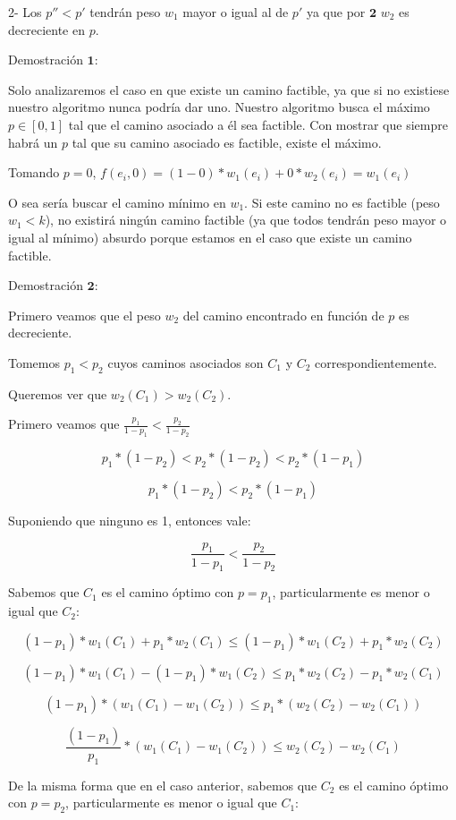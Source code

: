 2- Los $p'' < p'$ tendrán peso $w_1$ mayor o igual al de $p'$ ya que por $\mathbf{2}$ $w_2$ es decreciente en $p$.


Demostraci\'on $\mathbf{1}:$

Solo analizaremos el caso en que existe un camino factible, ya que si no existiese nuestro algoritmo nunca podr\'ia dar uno.
Nuestro algoritmo busca el m\'aximo $p \in [0,1]$ tal que el camino asociado a \'el sea factible. Con mostrar que siempre habrá un $p$ tal que su camino asociado es factible, existe el m\'aximo.

Tomando $p=0$, $f(e_i,0) = (1-0)*w_1(e_i) + 0*w_2(e_i) = w_1(e_i)$

O sea ser\'ia buscar el camino m\'inimo en $w_1$. Si este camino no es factible (peso $w_1 < k$), no existirá ningún camino factible (ya que todos tendrán peso mayor o igual al m\'inimo) absurdo porque estamos en el caso que existe un camino factible.

Demostraci\'on $\mathbf{2}:$

Primero veamos que el peso $w_2$ del camino encontrado en función de $p$ es decreciente.

Tomemos $p_1 < p_2$ cuyos caminos asociados son $C_1$ y $C_2$ correspondientemente.

Queremos ver que $w_2(C_1) > w_2(C_2)$.

Primero veamos que $\frac{p_1}{1-p_1} < \frac{p_2}{1-p_2}$

$$ p_1* (1-p_2) < p_2 * (1-p_2) < p_2 * (1-p_1)$$

$$ p_1 * (1-p_2) < p_2 * (1-p_1)$$

Suponiendo que ninguno es 1, entonces vale:

$$ \frac{p_1}{1-p_1} < \frac{p_2}{1-p_2} $$ 


Sabemos que $C_1$ es el camino óptimo con $p=p_1$, particularmente es menor o igual que $C_2$:

$$(1-p_1)*w_1(C_1) + p_1*w_2(C_1) \leq (1-p_1)*w_1(C_2) + p_1*w_2(C_2) $$

$$(1-p_1)*w_1(C_1) - (1-p_1)*w_1(C_2) \leq  p_1*w_2(C_2) - p_1*w_2(C_1) $$

$$(1-p_1)*(w_1(C_1) - w_1(C_2)) \leq  p_1*(w_2(C_2) - w_2(C_1)) $$

$$\frac{(1-p_1)}{p_1}*(w_1(C_1) - w_1(C_2)) \leq  w_2(C_2) - w_2(C_1) $$

De la misma forma que en el caso anterior, sabemos que $C_2$ es el camino óptimo con $p=p_2$, particularmente es menor o igual que $C_1$:

